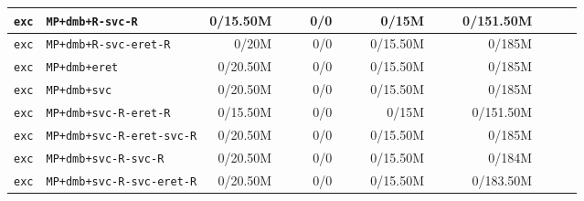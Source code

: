 \begin{tabular}{l l  | r r l | r r l | r r l | r r l l}
            \verb|exc| &                                       \verb|MP+dmb+R-svc-R| &       0/15.50M &                       &                   &            0/0 &                       &  &          0/15M &                       &                   &      0/151.50M &                       &                    & \\ \hline 
            \verb|exc| &                                  \verb|MP+dmb+R-svc-eret-R| &          0/20M &                       &                   &            0/0 &                       &  &       0/15.50M &                       &                   &         0/185M &                       &                    & \\ \hline 
            \verb|exc| &                                          \verb|MP+dmb+eret| &       0/20.50M &                       &                   &            0/0 &                       &  &       0/15.50M &                       &                   &         0/185M &                       &                    & \\ \hline 
            \verb|exc| &                                           \verb|MP+dmb+svc| &       0/20.50M &                       &                   &            0/0 &                       &  &       0/15.50M &                       &                   &         0/185M &                       &                    & \\ \hline 
            \verb|exc| &                                  \verb|MP+dmb+svc-R-eret-R| &       0/15.50M &                       &                   &            0/0 &                       &  &          0/15M &                       &                   &      0/151.50M &                       &                    & \\ \hline 
            \verb|exc| &                              \verb|MP+dmb+svc-R-eret-svc-R| &       0/20.50M &                       &                   &            0/0 &                       &  &       0/15.50M &                       &                   &         0/185M &                       &                    & \\ \hline 
            \verb|exc| &                                   \verb|MP+dmb+svc-R-svc-R| &       0/20.50M &                       &                   &            0/0 &                       &  &       0/15.50M &                       &                   &         0/184M &                       &                    & \\ \hline 
            \verb|exc| &                              \verb|MP+dmb+svc-R-svc-eret-R| &       0/20.50M &                       &                   &            0/0 &                       &  &       0/15.50M &                       &                   &      0/183.50M &                       &                    & \\ \hline 

\end{tabular}
